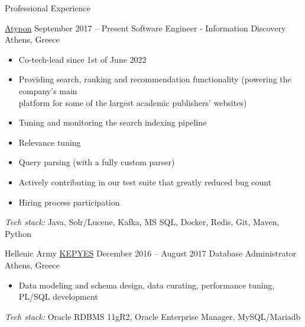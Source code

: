 \documentclass{resume}
\begin{document}
\newcommand{\mytilde}{\raise.17ex\hbox{$\scriptstyle\mathtt{\sim}$}}
\newcommand{\indentitem}{\setlength\itemindent{25pt}}



\begin{rSection}{Professional Experience}

\begin{rSubsection}
  {\href{https://www.atypon.com/about-us/}{Atypon}}
  {September 2017 -- Present}
  {Software Engineer - Information Discovery}
  {Athens, Greece}
    \begin{itemize}[label={-}]
\setlength\itemsep{-0.3em}
   \item Co-tech-lead since 1st of June 2022
   \item Providing search, ranking and recommendation functionality (powering the company's main\\platform for some of the largest academic publishers' websites)
	\item Tuning and monitoring the search indexing pipeline 
	\item Relevance tuning
	\item Query parsing (with a fully custom parser)
	\item Actively contributing in our test suite that greatly reduced bug count
	\item Hiring process participation

    \end{itemize}
   \textit{Tech stack:} Java, Solr/Lucene, Kafka, MS SQL, Docker, Redis, Git, Maven, Python
\end{rSubsection}

\begin{rSubsection}
  {Hellenic Army \href{http://army.gr/el/organosi/monades-ypiresies/kentro-pliroforikis-ypostirixis-ellinikoy-stratoy-kepyes}{KEPYES}}
  {December 2016 -- August 2017}
  {Database Administrator}
  {Athens, Greece}
    \begin{itemize}[label={-}]
\setlength\itemsep{-0.3em}
   \item Data modeling and schema design, data curating, performance tuning, PL/SQL development

    \end{itemize}
   \textit{Tech stack:} Oracle RDBMS 11gR2, Oracle Enterprise Manager, MySQL/Mariadb
 
\end{rSubsection}


\end{rSection}
\end{document}
